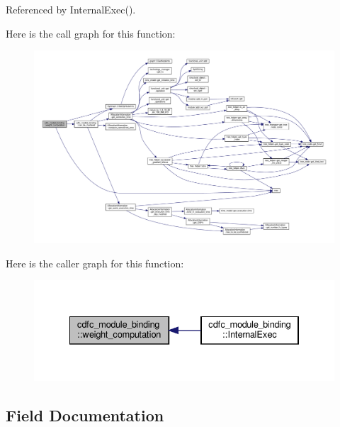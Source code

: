 Referenced by Internal\+Exec().

Here is the call graph for this function\+:
\nopagebreak
\begin{figure}[H]
\begin{center}
\leavevmode
\includegraphics[width=350pt]{d9/dc4/classcdfc__module__binding_ae26b6940aebc7b96eff2552c3f9e11b4_cgraph}
\end{center}
\end{figure}
Here is the caller graph for this function\+:
\nopagebreak
\begin{figure}[H]
\begin{center}
\leavevmode
\includegraphics[width=334pt]{d9/dc4/classcdfc__module__binding_ae26b6940aebc7b96eff2552c3f9e11b4_icgraph}
\end{center}
\end{figure}


\subsection{Field Documentation}
\mbox{\label{classcdfc__module__binding_a089a62ab1ebf57334b0b0529388cccbd}} 
